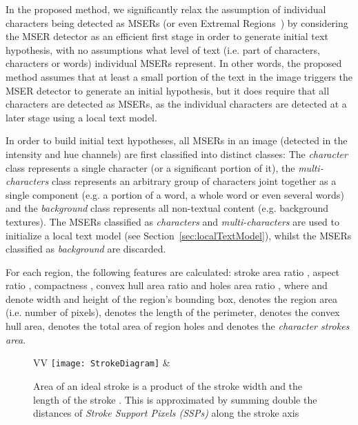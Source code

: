 \documentclass[conference]{IEEEtran}
\begin{document}
In the proposed method, we significantly relax the assumption of individual characters being detected as MSERs (or even Extremal Regions~\cite{Neumann-CVPR2012, Neumann-ICDAR2013}) by considering the MSER detector as an efficient first stage in order to generate initial text hypothesis, with no assumptions what level of text (i.e. part of characters, characters or words) individual MSERs represent. In other words, the proposed method assumes that at least a small portion of the text in the image triggers the MSER detector to generate an initial hypothesis, but it does require that all characters are detected as MSERs, as the individual characters are detected at a later stage using a local text model.

In order to build initial text hypotheses, all MSERs in an image (detected in the intensity and hue channels) are first classified into  distinct classes: The \emph{character} class represents a single character (or a significant portion of it), the \emph{multi-characters} class represents an arbitrary group of characters joint together as a single component (e.g. a portion of a word, a whole word or even several words) and the \emph{background} class represents all non-textual content (e.g. background textures). The MSERs classified as \emph{characters} and \emph{multi-characters} are used to initialize a local text model (see Section~\ref{sec:localTextModel}), whilst the MSERs classified as \emph{background} are discarded.


For each region, the following features are calculated: stroke area ratio , aspect ratio , compactness , convex hull area ratio  and holes area ratio ,
where  and  denote width and height of the region's bounding box,  denotes the region area (i.e. number of pixels),  denotes the length of the perimeter,  denotes the convex hull area,  denotes the total area of region holes and  denotes the \emph{character strokes area}.

\begin{figure}
\centering
\begin{tabular}{VV}
\texttt{[image: StrokeDiagram]} &

\end{tabular}
\caption{Area  of an ideal stroke is a product of the stroke width  and the length of the stroke . This is approximated by summing double the distances  of \emph{Stroke Support Pixels (SSPs)} along the stroke axis }
\label{fig:strokearea}
\vspace{-5pt}
\end{figure}
\end{document}
